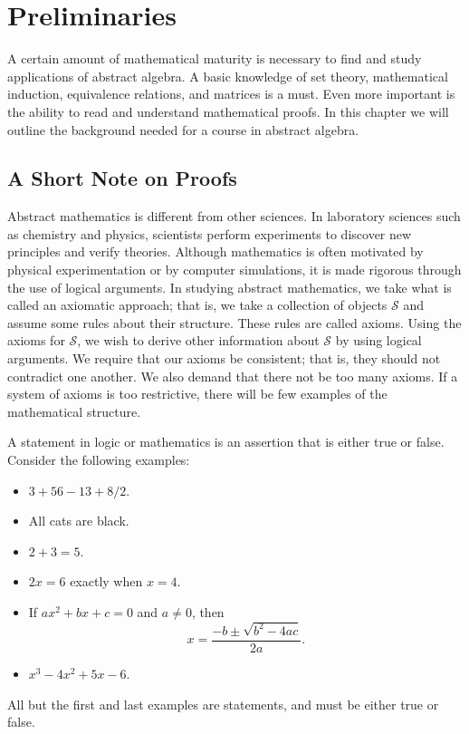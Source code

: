 \chapter{Preliminaries}\label{sets}
 
A certain amount of mathematical maturity is necessary to find and study applications of abstract algebra.  A basic knowledge of set theory, mathematical induction, equivalence relations, and matrices is a must.  Even more important is the ability to read and understand mathematical proofs.  In this chapter we will outline the background needed for a course in abstract algebra. 
 

\section{A Short Note on Proofs}\label{sets_section_1}
 
Abstract mathematics is different from other sciences. In laboratory sciences such as chemistry and physics, scientists perform experiments to discover new principles and verify theories.  Although mathematics is often motivated by physical experimentation or by computer simulations, it is made rigorous through the use of logical arguments.  In studying abstract mathematics, we take what is called an  axiomatic approach; that is, we take a collection of objects $\mathcal S$ and assume some rules about their structure.  These rules are called {\bfi axioms}.  Using the axioms for $\mathcal S$, we wish to derive other information about $\mathcal S$ by using logical arguments.  We require that our axioms be consistent; that is, they should not contradict one another.  We also demand that there not be too many axioms.  If a system of axioms is too restrictive,  there will be few examples of the mathematical structure.  

A {\bfi statement\/} in logic or mathematics is an assertion that is either true or false.  Consider the following examples:
\begin{itemize}
 
\item
$3 + 56 - 13 + 8/2 $.
 
\item
All cats are black.
 
\item
$2 + 3 = 5$.
 
\item
$2x = 6$ exactly when $x = 4$.
 
\item
If $ax^2 + bx + c = 0$ and $a \neq 0$, then
$$
x = \frac{-b \pm \sqrt{b^2 - 4ac}}{2a}.
$$
 
\item
$x^3 - 4x^2 + 5 x - 6$.
 
\end{itemize}
All but the first  and last examples are statements, and must be either true or false.  
 
